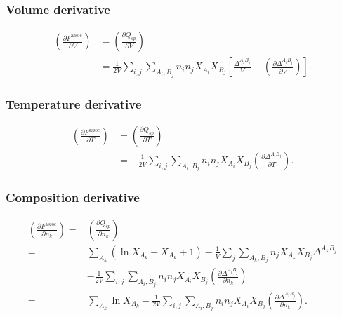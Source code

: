 \documentclass[internal,english]{sintefmemo2012}
\newcommand*{\pder}[2]{\left(\frac{\partial #1}{\partial #2}\right)}
\newcommand{\lp}{\left(}
\newcommand{\rp}{\right)}
\begin{document}
\subsubsection{Volume derivative}
\begin{align}
  \pder{F^{\text{assoc}}}{V} &= \pder{Q_{sp}}{V} \\ \nonumber
  &= \frac{1}{2V} \sum_{i,j} \sum_{A_i, B_j} n_i n_j X_{A_i} X_{B_j} \left[ \frac{\Delta^{A_i B_j}}{V} - \pder{\Delta^{A_i B_j}}{V} \right].
\end{align}

\subsubsection{Temperature derivative}
\begin{align}
  \pder{F^{\text{assoc}}}{T} &= \pder{Q_{sp}}{T} \\ \nonumber
  &= -\frac{1}{2V} \sum_{i,j} \sum_{A_i, B_j} n_i n_j X_{A_i} X_{B_j} \pder{\Delta^{A_i B_j}}{T}.
\end{align}

\subsubsection{Composition derivative}
\begin{align}
  \pder{F^{\text{assoc}}}{n_k} =& \pder{Q_{sp}}{n_k} \nonumber \\ 
  =& \sum_{A_k} \lp \ln X_{A_k} - X_{A_k} + 1\rp - \frac{1}{V} \sum_{j} \sum_{A_k,B_j} n_j X_{A_k} X_{B_j} \Delta^{A_k B_j} \label{l1}\\
  &- \frac{1}{2V} \sum_{i,j} \sum_{A_i, B_j} n_i n_j X_{A_i} X_{B_j} \pder{\Delta^{A_i B_j}}{n_k} \label{l2}\\
  =& \sum_{A_k} \ln X_{A_k} - \frac{1}{2V} \sum_{i,j} \sum_{A_i, B_j} n_i n_j X_{A_i} X_{B_j} \pder{\Delta^{A_i B_j}}{n_k}. \label{nono}
\end{align}
\end{document}
